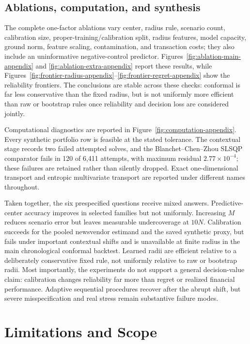 \documentclass[11pt]{article}
\newcommand{\1}{\mathbf{1}}
\begin{document}
\subsection{Ablations, computation, and synthesis}

The complete one-factor ablations vary center, radius rule, scenario count, calibration size, proper-training/calibration split, radius features, model capacity, ground norm, feature scaling, contamination, and transaction costs; they also include an uninformative negative-control predictor.  Figures~\ref{fig:ablation-main-appendix} and \ref{fig:ablation-extra-appendix} report these results, while Figures~\ref{fig:frontier-radius-appendix}--\ref{fig:frontier-regret-appendix} show the reliability frontiers.  The conclusions are stable across these checks: conformal is far less conservative than the fixed radius, but is not uniformly more efficient than raw or bootstrap rules once reliability and decision loss are considered jointly.

Computational diagnostics are reported in Figure~\ref{fig:computation-appendix}.  Every synthetic portfolio row is feasible at the stated tolerance.  The contextual stage records two failed attempted solves, and the Blanchet--Chen--Zhou SLSQP comparator fails in 120 of 6,411 attempts, with maximum residual $2.77\times10^{-4}$; these failures are retained rather than silently dropped.  Exact one-dimensional transport and entropic multivariate transport are reported under different names throughout.

Taken together, the six prespecified questions receive mixed answers.  Predictive-center accuracy improves in selected families but not uniformly.  Increasing $M$ reduces scenario error but leaves measurable undercoverage at $10N$.  Calibration succeeds for the pooled newsvendor estimand and the saved synthetic proxy, but fails under important contextual shifts and is unavailable at finite radius in the main chronological conformal backtest.  Learned radii are efficient relative to a deliberately conservative fixed rule, not uniformly relative to raw or bootstrap radii.  Most importantly, the experiments do not support a general decision-value claim: calibration changes reliability far more than regret or realized financial performance.  Adaptive sequential procedures recover after the abrupt shift, but severe misspecification and real stress remain substantive failure modes.

\FloatBarrier

\section{Limitations and Scope}
\end{document}
